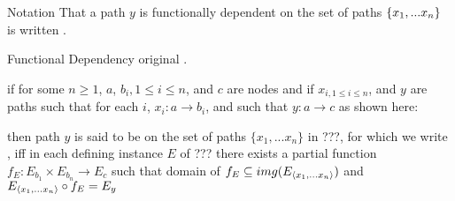 \documentclass[xcolor=pst,dvips]{beamer}
\begin{document}
\begin{frame}{Notation}
That a path  $y$ is functionally dependent on the set of paths $\left\{x_1,...x_n\right\}$ 
is written  .
\end{frame}

\iffalse
\begin{frame}{Functional Dependency original}
\IfSforproductepimonoCwithRCwords.
 
if for some $n \geq 1$, $a$, $b_{i}, 1 \leq i \leq n$,  and $c$ are nodes and 
if  $x_{i, 1 \leq i \leq n}$, and $y$ are paths such
that for each $i$, $x_i : a \rightarrow b_i$, and such that $y: a \rightarrow c$ 
as shown here:
\begin{center}
\end{center}
 
then path $y$ is said to be  on the set of paths $\{x_1,...x_n\}$ in ???, 
for which  we write  ,
iff
 in each defining instance $E$ of ??? there exists a  partial 
function $f_E: E_{b_1} \times E_{b_n} \rightarrow E_c$ 
\noindent such that 
domain of $f_E \subseteq img(E_{\langle x_1,... x_n \rangle})$ 
and  
$E_{\langle x_1,...x_n\rangle} \circ f_E = E_y$ 


\end{frame}
\end{document}
